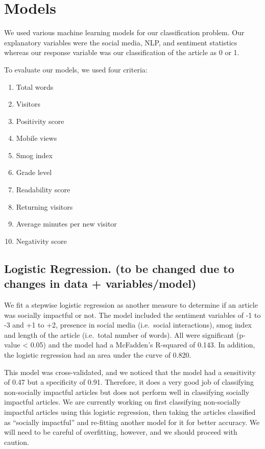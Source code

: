 \documentclass[10pt,letterpaper]{article}
\providecommand{\tightlist}{%
  \setlength{\itemsep}{0pt}\setlength{\parskip}{0pt}}
\begin{document}
\hypertarget{models}{%
\section{Models}\label{models}}

We used various machine learning models for our classification problem.
Our explanatory variables were the social media, NLP, and sentiment
statistics whereas our response variable was our classification of the
article as 0 or 1.

To evaluate our models, we used four criteria:

\begin{enumerate}
\def\labelenumi{\arabic{enumi}.}
\tightlist
\item
  Total words
\item
  Visitors
\item
  Positivity score
\item
  Mobile views
\item
  Smog index
\item
  Grade level
\item
  Readability score
\item
  Returning visitors
\item
  Average minutes per new visitor
\item
  Negativity score
\end{enumerate}

\subsection{Logistic Regression. (to be changed due to changes in data +
variables/model)}\label{logistic-regression.-to-be-changed-due-to-changes-in-data-variablesmodel}

We fit a stepwise logistic regression as another measure to determine if
an article was socially impactful or not. The model included the
sentiment variables of -1 to -3 and +1 to +2, presence in social media
(i.e.~social interactions), smog index and length of the article
(i.e.~total number of words). All were significant (p-value \textless{}
0.05) and the model had a McFadden's R-squared of 0.143. In addition,
the logistic regression had an area under the curve of 0.820.

This model was cross-validated, and we noticed that the model had a
sensitivity of 0.47 but a specificity of 0.91. Therefore, it does a very
good job of classifying non-socially impactful articles but does not
perform well in classifying socially impactful articles. We are
currently working on first classifying non-socially impactful articles
using this logistic regression, then taking the articles classified as
``socially impactful'' and re-fitting another model for it for better
accuracy. We will need to be careful of overfitting, however, and we
should proceed with caution.
\end{document}
